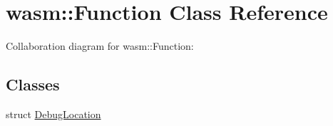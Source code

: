 \hypertarget{classwasm_1_1_function}{}\section{wasm\+:\+:Function Class Reference}
\label{classwasm_1_1_function}


Collaboration diagram for wasm\+:\+:Function\+:
\subsection*{Classes}
\begin{DoxyCompactItemize}
\item 
struct \mbox{\hyperlink{structwasm_1_1_function_1_1_debug_location}{Debug\+Location}}
\end{DoxyCompactItemize}

